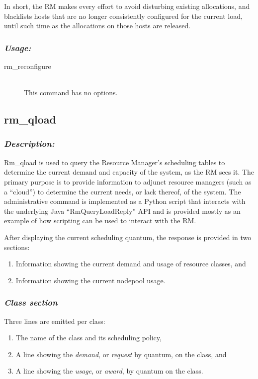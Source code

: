     In short, the RM makes every effort to avoid disturbing existing allocations, and blacklists
    hosts that are no longer consistently configured for the current load, until such time as
    the allocations on those hosts are released.

    \subsubsection{\em Usage:}

    \begin{description}
      \item[rm\_reconfigure] \hfill \\ 
        This command has no options.
      \end{description}
             
       
\iffalse  %

\subsection{rm\_qload}
\label{subsec:admin.rm-qload}

    \subsubsection{{\em Description:}}
    Rm\_qload is used to query the Resource Manager's scheduling tables to determine the
    current demand and capacity of the system, as the RM sees it.  The primary purpose
    is to provide information to adjunct resource managers (such as a ``cloud'') to
    determine the current needs, or lack thereof, of the system.  The administrative
    command is implemented as a Python script that interacts with the underlying
    Java ``RmQueryLoadReply'' API and is provided mostly as an example of how
    scripting can be used to interact with the RM.

    After displaying the current scheduling quantum, the response is provided in two sections:
    \begin{enumerate}
      \item Information showing the current demand and usage of resource classes, and
      \item Information showing the current nodepool usage.
    \end{enumerate}

    \subsubsection{\em Class section}
    Three lines are emitted per class:
    \begin{enumerate}
      \item The name of the class and its scheduling policy,
      \item A line showing the {\em demand}, or {\em request} by quantum, on the class, and
      \item A line showing the {\em usage}, or {\em award}, by quantum on the class.
    \end{enumerate}
    
